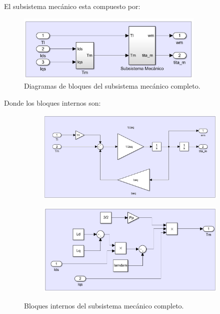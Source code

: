 \documentclass{article}
\begin{document}
El subsistema mecánico esta compuesto por:

\begin{figure}[H]
    \centering
    \includegraphics[width=0.8\textwidth]{sub_mecanico.png}
    \caption{Diagramas de bloques del subsistema mecánico completo.}
\end{figure}

Donde los bloques internos son:

\begin{figure}[H]
    \centering
    \begin{subfigure}[b]{0.45\textwidth}
        \centering
        \includegraphics[width=1\textwidth]{sub_mecanico2.png}
    \end{subfigure}
    \begin{subfigure}[b]{0.45\textwidth}
        \centering
        \includegraphics[width=1\textwidth]{sub_mecanico3.png}
    \end{subfigure}
    \caption{Bloques internos del subsistema mecánico completo.}
\end{figure}
\end{document}
